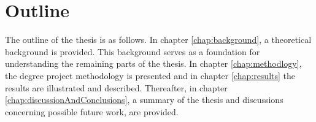 \documentclass{kththesis}
\newcommand{\fbcomment}[1]{{#1}}
\renewcommand{\fbcomment}[1]{}
\begin{document}

\section{Outline}
\fbcomment{\color{red}Goal: Introduce the outline of the report (Will probably be a bit more specific in the final version of the report)}
The outline of the thesis is as follows. In chapter \ref{chap:background}, a theoretical background is provided. This background serves as a foundation for understanding the remaining parts of the thesis. In chapter \ref{chap:methodlogy}, the degree project methodology is presented and in chapter \ref{chap:results} the results are illustrated and described. Thereafter, in chapter \ref{chap:discussionAndConclusions}, a summary of the thesis and discussions concerning possible future work, are provided.
 
\end{document}

